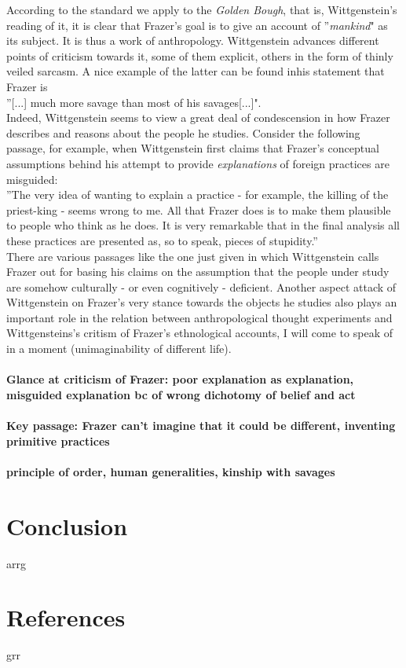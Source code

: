 \documentclass{article}
\begin{document}
According to the standard we apply to the \textit{Golden Bough}, that is, Wittgenstein's reading of it, it is clear that Frazer's goal is to give an account of ''\textit{mankind}" as its subject. It is thus a work of anthropology. Wittgenstein advances different points of criticism towards it, some of them explicit, others in the form of thinly veiled sarcasm. A nice example of the latter can be found inhis statement that Frazer is \\
''[...] much more savage than most of his savages[...]".\\
 Indeed, Wittgenstein seems to view a great deal of condescension in how Frazer describes and reasons about the people he studies. Consider the following passage, for example, when Wittgenstein first claims that Frazer's conceptual assumptions behind his attempt to provide \textit{explanations} of foreign practices are misguided:\\
 ''The very idea of wanting to explain a practice - for example, the killing of the priest-king - seems wrong to me. All that Frazer does is to make them plausible to people who think as he does. It is very remarkable that in the final analysis all these practices are presented as, so to speak, pieces of stupidity.''\\
 There are various passages like the one just given in which Wittgenstein calls Frazer out for basing his claims on the assumption that the people under study are somehow culturally - or even cognitively - deficient. Another aspect attack of Wittgenstein on Frazer's very stance towards the objects he studies also plays an important role in the relation between anthropological thought experiments and Wittgensteins's critism of Frazer's ethnological accounts, I will come to speak of in a moment (unimaginability of different life). 
\paragraph{Glance at criticism of Frazer: poor explanation as explanation, misguided explanation bc of wrong dichotomy of belief and act}
\paragraph{Key passage: Frazer can't imagine that it could be different, inventing primitive practices}
\paragraph{principle of order, human generalities, kinship with savages}
\paragraph{}



\section{Conclusion}
\hypertarget{sec4}{arrg}
\section{References}
\hypertarget{sec5}{grr}
\end{document}
